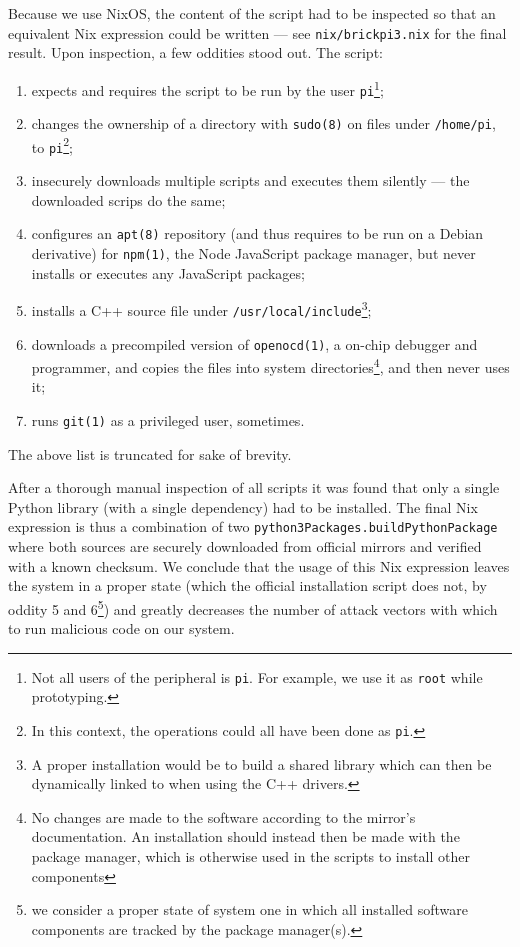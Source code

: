 Because we use NixOS, the content of the script had to be inspected so that an equivalent Nix expression could be written ---
see \texttt{nix/brickpi3.nix} for the final result.
Upon inspection, a few oddities stood out. The script:
\begin{enumerate}
\item expects and requires the script to be run by the user \texttt{pi}\footnote{Not all users of the peripheral is \texttt{pi}. For example, we use it as \texttt{root} while prototyping.};
\item changes the ownership of a directory with \texttt{sudo(8)} on files under \texttt{/home/pi}, to \texttt{pi}\footnote{In this context, the operations could all have been done as \texttt{pi}.};
\item insecurely downloads multiple scripts and executes them silently --- the downloaded scrips do the same;
\item configures an \texttt{apt(8)} repository (and thus requires to be run on a Debian derivative) for \texttt{npm(1)},
  the Node JavaScript package manager, but never installs or executes any JavaScript packages;
\item installs a C++ source file under \texttt{/usr/local/include}\footnote{A proper installation would be to build a shared library which can then be dynamically linked to when using the C++ drivers.};
\item downloads a precompiled version of \texttt{openocd(1)}, a on-chip debugger and programmer,
  and copies the files into system directories\footnote{No changes are made to the software according to the mirror's documentation. An installation should instead then be made with the package manager, which is otherwise used in the scripts to install other components}, and then never uses it;
\item runs \texttt{git(1)} as a privileged user, sometimes.
\end{enumerate}
The above list is truncated for sake of brevity.

After a thorough manual inspection of all scripts it was found that only a single Python library (with a single dependency) had to be installed.
The final Nix expression is thus a combination of two \texttt{python3Packages.buildPythonPackage} where both sources are securely downloaded from official mirrors and verified with a known checksum.
We conclude that the usage of this Nix expression leaves the system in a proper state (which the official installation script does not, by oddity 5 and 6\footnote{we consider a proper state of system one in which all installed software components are tracked by the package manager(s).}) and greatly decreases the number of attack vectors with which to run malicious code on our system.

